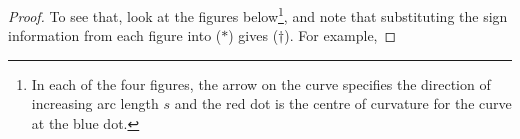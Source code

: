 \begin{proof}
To see that,
look at the figures below\footnote{In each of the four figures, the arrow on the curve specifies the direction of increasing arc length $s$ and 
the red dot is the centre of curvature for the curve at the blue dot.}, 
and note that substituting the sign information
from each figure into ($*$) gives ($\dagger$).
For example,
\end{proof}
